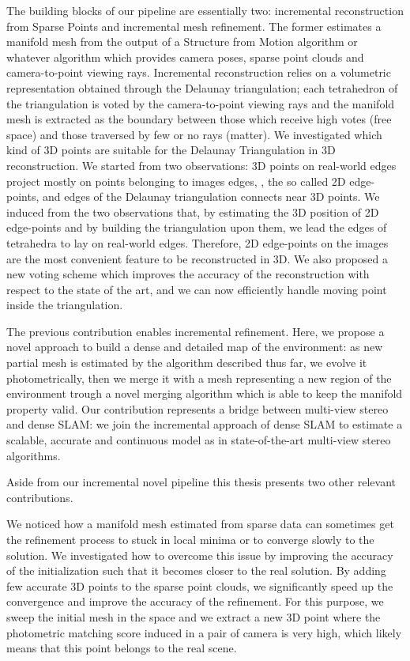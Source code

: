 The building blocks of our pipeline are essentially two: incremental reconstruction from Sparse Points and incremental mesh refinement.
The former estimates a  manifold mesh from the output of a Structure from Motion algorithm or whatever algorithm which provides camera poses, sparse point clouds and camera-to-point viewing rays.
Incremental reconstruction relies on a volumetric representation obtained through the Delaunay triangulation; each tetrahedron of the triangulation  is voted by the camera-to-point viewing rays and the manifold mesh is extracted as the boundary between those which receive high votes (free space) and those traversed by few or no rays (matter).
We investigated which kind of 3D points are suitable for the Delaunay Triangulation in 3D reconstruction.
We started from two observations: 3D points on real-world edges project mostly on  points belonging to images edges, \ie, the so called 2D edge-points, and edges of the Delaunay triangulation connects near 3D points.
We induced from the two observations that, by estimating the 3D position of 2D edge-points and by building the triangulation upon them, we lead the edges of tetrahedra  to lay on real-world edges.
Therefore, 2D edge-points on the images are the most convenient feature to be reconstructed in 3D.
We also proposed a new voting scheme which improves the accuracy of the reconstruction with respect to the state of the art, and we can now efficiently handle moving point inside the triangulation.

The previous contribution enables incremental refinement. Here, we propose a novel approach to build a dense and detailed map of the environment: as new partial mesh is estimated by the algorithm described thus far, we evolve it photometrically, then we merge it with a mesh representing a new region of the environment trough a novel merging algorithm which is able to keep the manifold property valid.
Our contribution represents a bridge between multi-view stereo and 
dense SLAM: we join the incremental approach of dense SLAM to estimate a  scalable, accurate and continuous model as in state-of-the-art multi-view stereo algorithms. 

Aside from our incremental novel pipeline this thesis presents two other relevant contributions.

We noticed how a manifold mesh estimated from sparse data can sometimes get the refinement process to stuck  in local minima or to converge slowly to the solution. 
We investigated how to overcome this issue by improving the accuracy of  the initialization such that it becomes closer to the real solution.
By adding few accurate 3D points to the sparse point clouds, we significantly speed up the convergence and improve the accuracy of the refinement.
For this purpose, we sweep the initial mesh in the space and we extract a new 3D point where the photometric matching score induced in a pair of camera is very high, which likely means that this point belongs to the real scene.

